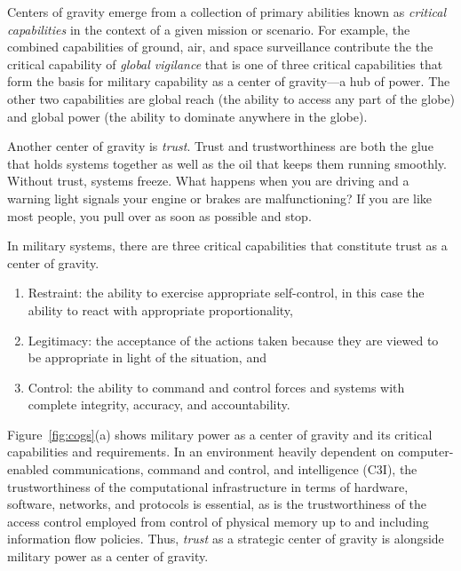 Centers of gravity emerge from a collection of primary abilities known
as \emph{critical capabilities} in the context of a given mission or
scenario.  For example, the combined capabilities of ground, air, and
space surveillance contribute the the critical capability of
\emph{global vigilance} that is one of three critical capabilities
that form the basis for military capability as a center of gravity---a
hub of power. The other two capabilities are global reach (the ability
to access any part of the globe) and global power (the ability to
dominate anywhere in the globe).

Another center of gravity is \emph{trust}.  Trust and trustworthiness
are both the glue that holds systems together as well as the oil that
keeps them running smoothly.  Without trust, systems freeze. What
happens when you are driving and a warning light signals your engine
or brakes are malfunctioning? If you are like most people, you pull
over as soon as possible and stop.

In military systems, there are three critical capabilities that
constitute trust as a center of gravity.
\begin{enumerate}
\item Restraint: the ability to exercise appropriate self-control, in
  this case the ability to react with appropriate proportionality,
\item Legitimacy: the acceptance of the actions taken because they are
  viewed to be appropriate in light of the situation, and
\item Control: the ability to command and control forces and systems
  with complete integrity, accuracy, and accountability.
\end{enumerate}
Figure~\ref{fig:cogs}(a) shows military power as a center of gravity
and its critical capabilities and requirements. In an environment
heavily dependent on computer-enabled communications, command and
control, and intelligence (C3I), the trustworthiness of the
computational infrastructure in terms of hardware, software, networks,
and protocols is essential, as is the trustworthiness of the access
control employed from control of physical memory up to and including
information flow policies. Thus, \emph{trust} as a strategic center of
gravity is alongside military power as a center of gravity.


